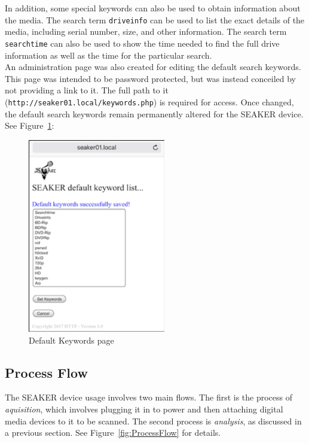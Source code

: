 \documentclass[12pt]{article}
\begin{document}
In addition, some special keywords can also be used to obtain information
about the media.  The search term \verb|driveinfo| can be used to list the exact details of
the media, including serial number, size, and other information.
The search term \verb|searchtime| can also be used to show the time needed to find the
full drive information as well as the time for the particular search.\\

An administration page was also created for editing the default search keywords.
This page was intended to be password protected, but was instead conceiled by not
providing a link to it.  The full path to it ({\tt http://seaker01.local/keywords.php})
is required for access.  Once changed, the default search keywords remain permanently
altered for the SEAKER device.  See Figure~\ref{fig:DefaultKeywords}:\\

\begin{figure}[H]
  \begin{center}
  \includegraphics[width=6cm]{images/DefaultKeywords.png}
  \caption{Default Keywords page}
  \label{fig:DefaultKeywords}
  \end{center}
\end{figure}

\subsection{Process Flow}

The SEAKER device usage involves two main flows.  The first is the 
process of {\em aquisition}, which involves plugging it in to power
and then attaching digital media devices to it to be scanned.
The second process is {\em analysis}, as discussed in a
previous section.
See Figure~\ref{fig:ProcessFlow} for details.
\end{document}
